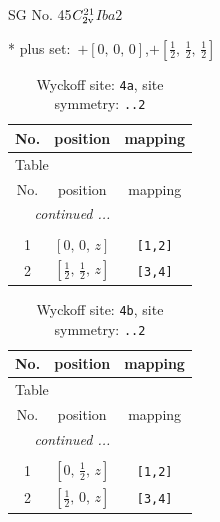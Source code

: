 \documentclass[fleqn,8pt]{jsarticle}
\begin{document}
\setcounter{MaxMatrixCols}{32}

\renewcommand{\tablename}{Table~}
\renewcommand{\figurename}{Figure~}
\begin{center}
\LARGE
SG No. 45\quad$C_{\rm 2v}^{21}$\quad$Iba2$\quad[ orthorhombic ]
\end{center}
* plus set:\,\,\,$+\left[ 0,\, 0,\, 0 \right]$,\quad $+\left[ \frac{1}{2},\, \frac{1}{2},\, \frac{1}{2} \right]$
\renewcommand{\arraystretch}{1.2}
\begin{longtable}{ccc}
\caption{Wyckoff site: {\tt 4a}, site symmetry: {\tt ..2}}
 \\
 \hline \hline
No. & position & mapping \\ \hline \endfirsthead

\multicolumn{2}{l}{\tablename\ \thetable{}} \\
 \hline \hline
No. & position & mapping \\ \hline \endhead

 \hline \hline
\multicolumn{2}{r}{\footnotesize\it continued ...} \\ \endfoot

 \hline \hline
\multicolumn{2}{r}{} \\ \endlastfoot

1 & $\left[ 0,\, 0,\, z \right]$ & {\tt [1,2]} \\ \hline
2 & $\left[ \frac{1}{2},\, \frac{1}{2},\, z \right]$ & {\tt [3,4]} \\
\end{longtable}
\renewcommand{\arraystretch}{1.2}
\begin{longtable}{ccc}
\caption{Wyckoff site: {\tt 4b}, site symmetry: {\tt ..2}}
 \\
 \hline \hline
No. & position & mapping \\ \hline \endfirsthead

\multicolumn{2}{l}{\tablename\ \thetable{}} \\
 \hline \hline
No. & position & mapping \\ \hline \endhead

 \hline \hline
\multicolumn{2}{r}{\footnotesize\it continued ...} \\ \endfoot

 \hline \hline
\multicolumn{2}{r}{} \\ \endlastfoot

1 & $\left[ 0,\, \frac{1}{2},\, z \right]$ & {\tt [1,2]} \\ \hline
2 & $\left[ \frac{1}{2},\, 0,\, z \right]$ & {\tt [3,4]} \\
\end{longtable}
\end{document}
